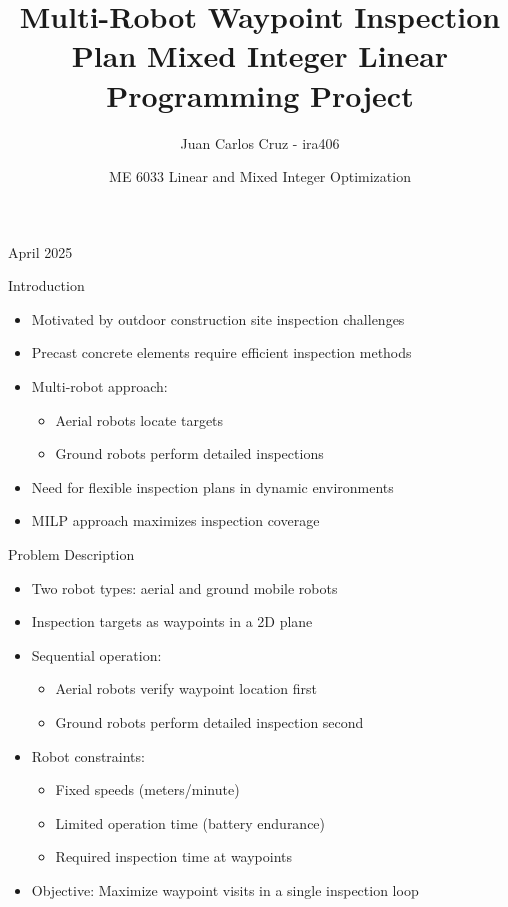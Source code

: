 \documentclass[11pt,xcolor={dvipsnames},hyperref={pdftex,pdfpagemode=UseNone,hidelinks,pdfdisplaydoctitle=true},usepdftitle=false]{beamer}
\title{Multi-Robot Waypoint Inspection Plan Mixed Integer Linear Programming Project}
\author{Juan Carlos Cruz - ira406}
\date{ME 6033 Linear and Mixed Integer Optimization}
\begin{document}
    
    \begin{frame}
      \titlepage
      April 2025
    \end{frame}
    
    \begin{frame}{Introduction}
      \begin{itemize}
        \item Motivated by outdoor construction site inspection challenges
        \item Precast concrete elements require efficient inspection methods
        \item Multi-robot approach:
          \begin{itemize}
            \item Aerial robots locate targets
            \item Ground robots perform detailed inspections
          \end{itemize}
        \item Need for flexible inspection plans in dynamic environments
        \item MILP approach maximizes inspection coverage
      \end{itemize}
    \end{frame}

    \begin{frame}{Problem Description}
      \begin{itemize}
        \item Two robot types: aerial and ground mobile robots
        \item Inspection targets as waypoints in a 2D plane
        \item Sequential operation:
          \begin{itemize}
            \item Aerial robots verify waypoint location first
            \item Ground robots perform detailed inspection second
          \end{itemize}
        \item Robot constraints:
          \begin{itemize}
            \item Fixed speeds (meters/minute)
            \item Limited operation time (battery endurance)
            \item Required inspection time at waypoints
          \end{itemize}
        \item Objective: Maximize waypoint visits in a single inspection loop
      \end{itemize}
    \end{frame}
\end{document}
